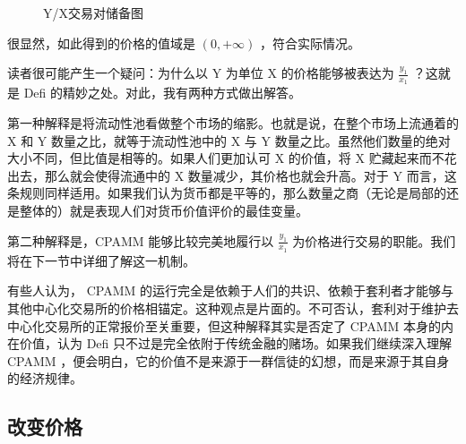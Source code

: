 \documentclass[12pt, a4paper, oneside]{ctexart}
\begin{document}
\begin{figure}[htbp]
    \centering
    \caption{Y/X交易对储备图}
\end{figure}

很显然，如此得到的价格的值域是 $(0,+\infty)$ ，符合实际情况。

读者很可能产生一个疑问：为什么以 Y 为单位 X 的价格能够被表达为 $\displaystyle \frac{y_1}{x_1}$ ？这就是 Defi 的精妙之处。对此，我有两种方式做出解答。

第一种解释是将流动性池看做整个市场的缩影。也就是说，在整个市场上流通着的 X 和 Y 数量之比，就等于流动性池中的 X 与 Y 数量之比。虽然他们数量的绝对大小不同，但比值是相等的。如果人们更加认可 X 的价值，将 X 贮藏起来而不花出去，那么就会使得流通中的 X 数量减少，其价格也就会升高。对于 Y 而言，这条规则同样适用。如果我们认为货币都是平等的，那么数量之商（无论是局部的还是整体的）就是表现人们对货币价值评价的最佳变量。

第二种解释是，CPAMM 能够比较完美地履行以 $\displaystyle \frac{y_1}{x_1}$ 为价格进行交易的职能。我们将在下一节中详细了解这一机制。

有些人认为， CPAMM 的运行完全是依赖于人们的共识、依赖于套利者才能够与其他中心化交易所的价格相锚定。这种观点是片面的。不可否认，套利对于维护去中心化交易所的正常报价至关重要，但这种解释其实是否定了 CPAMM 本身的内在价值，认为 Defi 只不过是完全依附于传统金融的赌场。如果我们继续深入理解 CPAMM ，便会明白，它的价值不是来源于一群信徒的幻想，而是来源于其自身的经济规律。

\subsection{改变价格}
\end{document}
